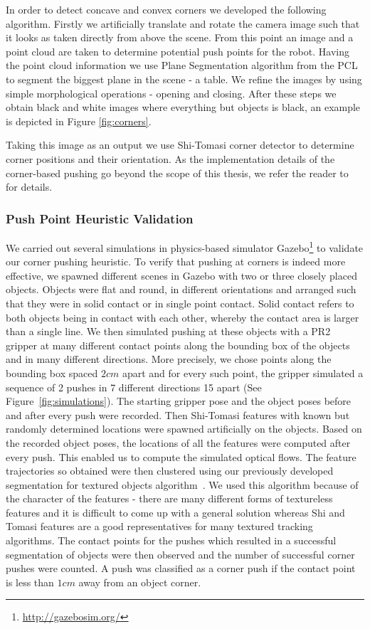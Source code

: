 In order to detect concave and convex corners we developed the following algorithm. Firstly we artificially translate and rotate the camera image such that it looks as taken directly from above the scene. From this point an image and a point cloud are taken to determine potential push points for the robot. Having the point cloud information we use Plane Segmentation algorithm from the PCL to segment the biggest plane in the scene - a table. We refine the images by using simple morphological operations - opening and closing. After these steps we obtain black and white images where everything but objects is black, an example is depicted in Figure \ref{fig:corners}. 

Taking this image as an output we use Shi-Tomasi corner detector to determine corner positions and their orientation. As the implementation details of the corner-based pushing go beyond the scope of this thesis, we refer the reader to~\cite{bersch12interactive} for details.

\subsubsection{Push Point Heuristic Validation}
We carried  out several simulations  in physics-based simulator Gazebo\footnote{\url{http://gazebosim.org/}} to validate  our corner
pushing heuristic. To verify that  pushing at corners is  indeed more
effective, we  spawned different  scenes in Gazebo  with two  or three
closely  placed objects. Objects were flat and round, in different orientations 
and arranged such that they were in solid contact or in single point contact. Solid  contact refers to  both objects being in  contact with
each  other,  whereby  the  contact  area  is  larger  than  a  single
line.
We  then simulated  pushing at  these objects
with a PR2 gripper at many different contact points along the bounding
box of the  objects and in many different  directions. More precisely,
we chose points along the bounding box spaced $2cm$ apart and for every
such  point,  the  gripper simulated  a  sequence  of  2 pushes  in  7
different directions {15\textdegree}  apart (See Figure~\ref{fig:simulations}). The starting gripper pose
and the object  poses before and after every  push were recorded. Then
Shi-Tomasi features with known but randomly determined  locations were spawned artificially on
the objects. Based on the  recorded object poses, the locations of all
the  features were  computed  after  every push.  This  enabled us  to
compute the simulated optical flows. The feature trajectories  so obtained were
then clustered using our previously developed segmentation for textured objects algorithm~\cite{bersch12interactive}.
We used this algorithm because of the character of the features - there are many different forms of textureless features and it is difficult to come up with a general solution whereas Shi and Tomasi features are a good representatives for many textured tracking algorithms.  The contact points for the
pushes  which resulted in  a successful  segmentation of  objects were
then  observed  and  the  number  of  successful  corner  pushes  were
counted. A push  was classified as a corner push  if the contact point
is less than $1cm$ away from an object corner.

